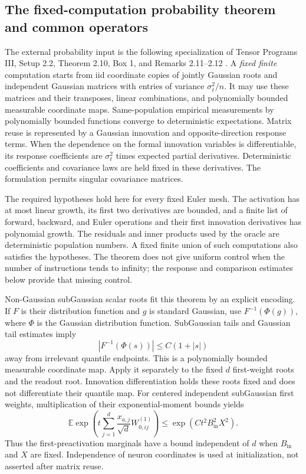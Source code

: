 \subsection{The fixed-computation probability theorem and common operators}
\label{app:fixed-program}

The external probability input is the following specialization of
Tensor Programs III, Setup 2.2, Theorem 2.10, Box 1, and Remarks
2.11--2.12 \cite{TP3}.  A \emph{fixed finite} computation starts from
iid coordinate copies of jointly Gaussian roots and independent Gaussian
matrices with entries of variance $\sigma_\ell^2/n$.  It may use these
matrices and their transposes, linear combinations, and polynomially
bounded measurable coordinate maps.  Same-population empirical
measurements by polynomially bounded functions converge to deterministic
expectations.  Matrix reuse is represented by a Gaussian innovation and
opposite-direction response terms.  When the dependence on the formal
innovation variables is differentiable, its response coefficients are
$\sigma_\ell^2$ times expected partial derivatives.  Deterministic
coefficients and covariance laws are held fixed in these derivatives.
The formulation permits singular covariance matrices.

The required hypotheses hold here for every fixed Euler mesh.  The
activation has at most linear growth, its first two derivatives are
bounded, and a finite list of forward, backward, and Euler operations
and their first innovation derivatives has polynomial growth.  The
residuals and inner products used by the oracle are deterministic
population numbers.  A fixed finite union of such computations also
satisfies the hypotheses.  The theorem does not give uniform control
when the number of instructions tends to infinity; the response and
comparison estimates below provide that missing control.

Non-Gaussian subGaussian scalar roots fit this theorem by an explicit
encoding.  If $F$ is their distribution function and $g$ is standard
Gaussian, use $F^{-1}(\Phi(g))$, where $\Phi$ is the Gaussian distribution
function.  SubGaussian tails and Gaussian tail estimates imply
\[
 |F^{-1}(\Phi(s))|\le C(1+|s|)
\]
away from irrelevant quantile endpoints.  This is a polynomially bounded
measurable coordinate map.  Apply it separately to the fixed $d$
first-weight roots and the readout root.  Innovation differentiation
holds these roots fixed and does not differentiate their quantile map.
For centered independent subGaussian first weights, multiplication of
their exponential-moment bounds yields
\[
 \mathbb E\exp\!\left(
    t\sum_{j=1}^d\frac{x_{a,j}}{\sqrt d}W_{0,ij}^{(1)}\right)
 \le \exp(Ct^2B_{\mathrm{in}}^2X^2).
\]
Thus the first-preactivation marginals have a bound independent of $d$
when $B_{\mathrm{in}}$ and $X$ are fixed.  Independence of neuron
coordinates is used at initialization, not asserted after matrix reuse.

